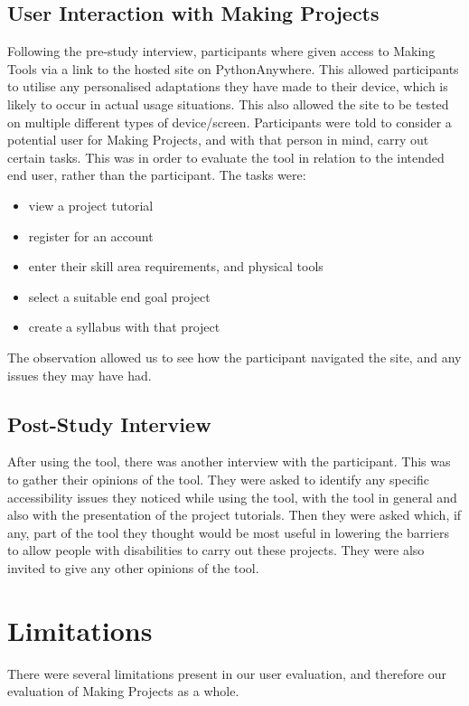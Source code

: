 \documentclass{l4proj}
\begin{document}
\subsection{User Interaction with Making Projects}
Following the pre-study interview, participants where given access to Making Tools via a link to the hosted site on PythonAnywhere. This allowed participants to utilise any personalised adaptations they have made to their device, which is likely to occur in actual usage situations. This also allowed the site to be tested on multiple different types of device/screen.  
Participants were told to consider a potential user for Making Projects, and with that person in mind, carry out certain tasks. This was in order to evaluate the tool in relation to the intended end user, rather than the participant. The tasks were:
\begin{itemize}
    \item view a project tutorial
    \item register for an account
    \item enter their skill area requirements, and physical tools 
    \item select a suitable end goal project
    \item create a syllabus with that project
\end{itemize}
The observation allowed us to see how the participant navigated the site, and any issues they may have had.

\subsection{Post-Study Interview}
After using the tool, there was another interview with the participant. This was to gather their opinions of the tool. They were asked to identify any specific accessibility issues they noticed while using the tool, with the tool in general and also with the presentation of the project tutorials. Then they were asked which, if any, part of the tool they thought would be most useful in lowering the barriers to allow people with disabilities to carry out these projects. They were also invited to give any other opinions of the tool. 

\section{Limitations}
\label{limitations}
There were several limitations present in our user evaluation, and therefore our evaluation of Making Projects as a whole. 
\end{document}
